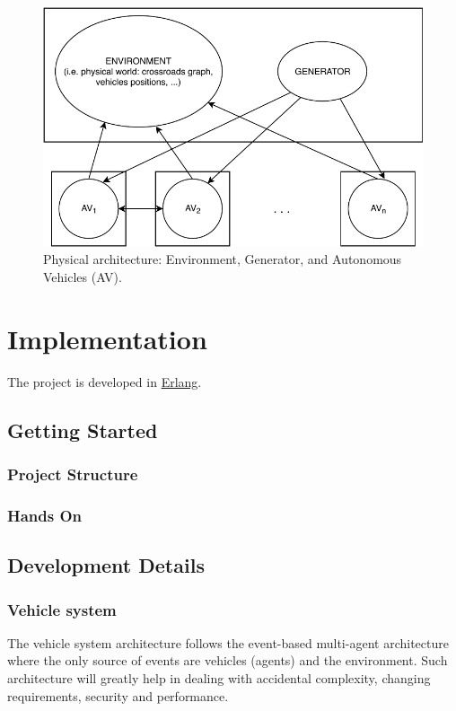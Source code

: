 \documentclass{memoir}
\begin{document}
\begin{figure}
	\centering
	\includegraphics[width=0.8\linewidth]{physical_architecture.pdf}
	\caption{Physical architecture: Environment, Generator, and Autonomous Vehicles (AV).}
	\label{fig:physical-architecture}
\end{figure}


\chapter{Implementation}
The project is developed in \href{https://www.erlang.org/}{Erlang}.

\section{Getting Started}
\subsection{Project Structure}
\subsection{Hands On}

\section{Development Details}

\subsection{Vehicle system}

The vehicle system architecture follows the event-based multi-agent architecture where the only source of events are vehicles (agents) and the environment.
Such architecture will greatly help in dealing with accidental complexity, changing requirements, security and performance.
\end{document}

